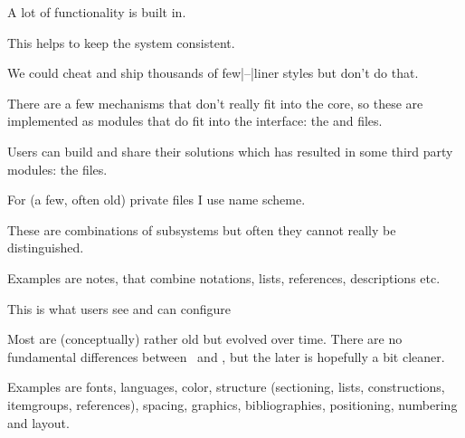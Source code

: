 \stopitemize

\stoptitle


\starttitle[title=Modules]

\startitemize

\startitem
    A lot of functionality is built in.
\stopitem

\startitem
    This helps to keep the system consistent.
\stopitem

\startitem
    We could cheat and ship thousands of few|--|liner styles but don't do that.
\stopitem

\startitem
    There are a few mechanisms that don't really fit into the core, so these are
    implemented as modules that do fit into the interface: the  and
     files.
\stopitem

\startitem
    Users can build and share their solutions which has resulted in some
    third party modules: the  files.
\stopitem

\startitem
    For (a few, often old) private files I use  name scheme.
\stopitem

\stopitemize

\stoptitle


\starttitle[title=Mechanisms]

\startitemize

\startitem
    These are combinations of subsystems but often they cannot really be distinguished.
\stopitem

\startitem
    Examples are notes, that combine notations, lists, references, descriptions etc.
\stopitem

\stopitemize

\stoptitle


\starttitle[title=Subsystems]

\startitemize

\startitem
    This is what users see and can configure
\stopitem

\startitem
    Most are (conceptually) rather old but evolved over time. There are no
    fundamental differences between \MKIV\ and \LMTX, but the later is hopefully
    a bit cleaner.
\stopitem

\startitem
    Examples are fonts, languages, color, structure (sectioning, lists,
    constructions, itemgroups, references), spacing, graphics, bibliographies,
    positioning, numbering and layout.
\stopitem

